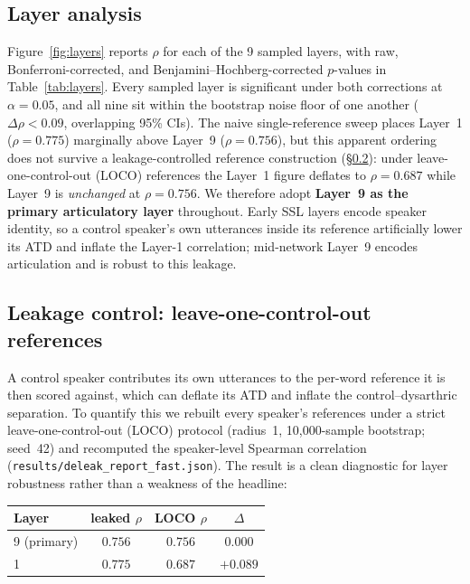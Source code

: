 \subsection{Layer analysis}
\label{sec:layers}
Figure~\ref{fig:layers} reports $\rho$ for each of the 9 sampled layers,
with raw, Bonferroni-corrected, and Benjamini--Hochberg-corrected
$p$-values in Table~\ref{tab:layers}. Every sampled layer is significant
under both corrections at $\alpha = 0.05$, and all nine sit within the
bootstrap noise floor of one another ($\Delta\rho < 0.09$, overlapping
95\% CIs). The naive single-reference sweep places Layer~1
($\rho = 0.775$) marginally above Layer~9 ($\rho = 0.756$), but this
apparent ordering does not survive a leakage-controlled reference
construction (\S\ref{sec:deleak}): under leave-one-control-out (LOCO)
references the Layer~1 figure deflates to $\rho = 0.687$ while Layer~9 is
\emph{unchanged} at $\rho = 0.756$. We therefore adopt \textbf{Layer~9 as
the primary articulatory layer} throughout. Early SSL layers encode
speaker identity, so a control speaker's own utterances inside its
reference artificially lower its ATD and inflate the Layer-1 correlation;
mid-network Layer~9 encodes articulation and is robust to this leakage.

\subsection{Leakage control: leave-one-control-out references}
\label{sec:deleak}
A control speaker contributes its own utterances to the per-word
reference it is then scored against, which can deflate its ATD and
inflate the control--dysarthric separation. To quantify this we rebuilt
every speaker's references under a strict leave-one-control-out (LOCO)
protocol (radius~1, 10{,}000-sample bootstrap; seed~42) and recomputed
the speaker-level Spearman correlation
(\texttt{results/deleak\_report\_fast.json}). The result is a clean
diagnostic for layer robustness rather than a weakness of the headline:

\begin{tabular}{lccc}
\toprule
Layer & leaked $\rho$ & LOCO $\rho$ & $\Delta$ \\
\midrule
9 (primary) & $0.756$ & $\mathbf{0.756}$ & $0.000$ \\
1           & $0.775$ & $0.687$ & $+0.089$ \\
\bottomrule
\end{tabular}

